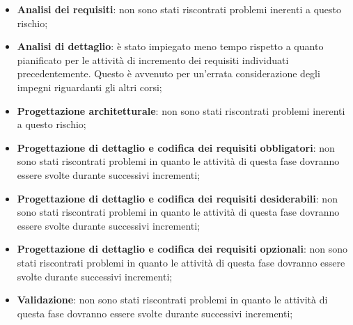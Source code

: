 			\begin{itemize}
				\item \textbf{Analisi dei requisiti}: non sono stati riscontrati problemi inerenti a questo rischio;
				\item \textbf{Analisi di dettaglio}: è stato impiegato meno tempo rispetto a quanto pianificato per le attività di incremento dei requisiti individuati precedentemente. Questo è avvenuto per un'errata considerazione degli impegni riguardanti gli altri corsi;
				\item \textbf{Progettazione architetturale}: non sono stati riscontrati problemi inerenti a questo rischio;
				\item \textbf{Progettazione di dettaglio e codifica dei requisiti obbligatori}: non sono stati riscontrati problemi in quanto le attività di questa fase dovranno essere svolte durante successivi incrementi;
				\item \textbf{Progettazione di dettaglio e codifica dei requisiti desiderabili}: non sono stati riscontrati problemi in quanto le attività di questa fase dovranno essere svolte durante successivi incrementi;
				\item \textbf{Progettazione di dettaglio e codifica dei requisiti opzionali}: non sono stati riscontrati problemi in quanto le attività di questa fase dovranno essere svolte durante successivi incrementi;
				\item \textbf{Validazione}: non sono stati riscontrati problemi in quanto le attività di questa fase dovranno essere svolte durante successivi incrementi;
			\end{itemize}



	\newpage
